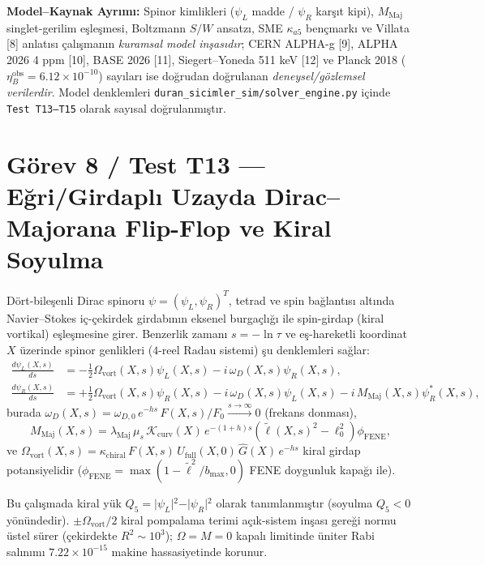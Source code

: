 \documentclass[12pt,a4paper]{article}
\begin{document}
\textbf{Model--Kaynak Ayrımı:} Spinor kimlikleri ($\psi_L$ madde / $\psi_R$ karşıt kipi), $M_{\mathrm{Maj}}$ singlet-gerilim eşleşmesi, Boltzmann $S/W$ ansatzı, SME $\kappa_{a5}$ bençmarkı ve Villata [8] anlatısı çalışmanın \textit{kuramsal model inşasıdır}; CERN ALPHA-g [9], ALPHA 2026 4 ppm [10], BASE 2026 [11], Siegert--Yoneda 511 keV [12] ve Planck 2018 ($\eta_B^{\mathrm{obs}} = 6.12 \times 10^{-10}$) sayıları ise doğrudan doğrulanan \textit{deneysel/gözlemsel verilerdir}. Model denklemleri \texttt{duran\_sicimler\_sim/solver\_engine.py} içinde \texttt{Test T13--T15} olarak sayısal doğrulanmıştır.

\section{Görev 8 / Test T13 --- Eğri/Girdaplı Uzayda Dirac--Majorana Flip-Flop ve Kiral Soyulma}

Dört-bileşenli Dirac spinoru $\psi = (\psi_L, \psi_R)^T$, tetrad ve spin bağlantısı altında Navier--Stokes iç-çekirdek girdabının eksenel burgaçlığı ile spin-girdap (kiral vortikal) eşleşmesine girer. Benzerlik zamanı $s = -\ln \tau$ ve eş-hareketli koordinat $X$ üzerinde spinor genlikleri ($4$-reel Radau sistemi) şu denklemleri sağlar:
\begin{equation}
\begin{split}
\frac{d \psi_L(X, s)}{ds} &= -\frac{1}{2} \Omega_{\mathrm{vort}}(X, s) \psi_L(X, s) - i \, \omega_D(X, s) \psi_R(X, s), \\
\frac{d \psi_R(X, s)}{ds} &= +\frac{1}{2} \Omega_{\mathrm{vort}}(X, s) \psi_R(X, s) - i \, \omega_D(X, s) \psi_L(X, s) - i \, M_{\mathrm{Maj}}(X, s) \psi_R^*(X, s),
\end{split}
\label{eq:dirac}
\end{equation}
burada $\omega_D(X, s) = \omega_{D,0} \, e^{-h s} \, F(X, s)/F_0 \xrightarrow{s \to \infty} 0$ (frekans donması),
\begin{equation}
M_{\mathrm{Maj}}(X, s) = \lambda_{\mathrm{Maj}} \, \mu_s \, \mathcal{K}_{\mathrm{curv}}(X) \, e^{-(1+h)s} \left(\tilde{\ell}(X, s)^2 - \ell_0^2\right) \phi_{\mathrm{FENE}},
\label{eq:mmaj}
\end{equation}
ve $\Omega_{\mathrm{vort}}(X, s) = \kappa_{\mathrm{chiral}} \, F(X, s) \, U_{\mathrm{full}}(X, 0) \, \hat{G}(X) \, e^{-h s}$ kiral girdap potansiyelidir ($\phi_{\mathrm{FENE}} = \max(1-\tilde{\ell}^2/b_{\max}, 0)$ FENE doygunluk kapağı ile).

Bu çalışmada kiral yük $Q_5 = \vert{}\psi_L\vert{}^2 - \vert{}\psi_R\vert{}^2$ olarak tanımlanmıştır (soyulma $Q_5 < 0$ yönündedir). $\pm \Omega_{\mathrm{vort}}/2$ kiral pompalama terimi açık-sistem inşası gereği normu üstel sürer (çekirdekte $R^2 \sim 10^3$); $\Omega = M = 0$ kapalı limitinde üniter Rabi salınımı $7.22 \times 10^{-15}$ makine hassasiyetinde korunur.
\end{document}
